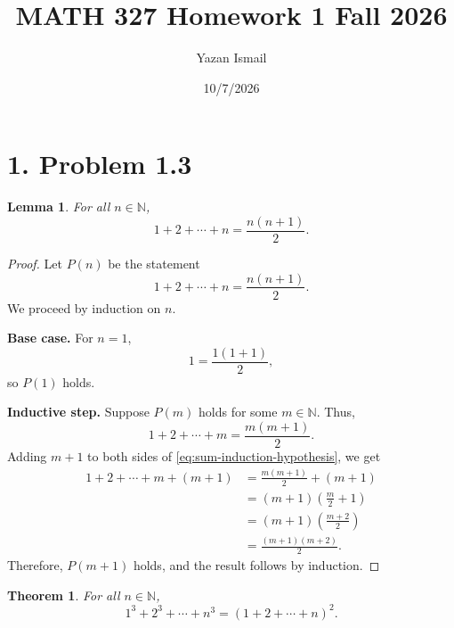 \documentclass[11pt]{article}
\title{MATH 327 Homework 1 Fall 2026}
\author{Yazan Ismail}
\date{10/7/2026}
\newtheorem{theorem}{Theorem}
\newtheorem{lemma}{Lemma}
\begin{document}
\maketitle

\section*{1. Problem 1.3}

\begin{lemma}\label{lem:sum}
For all \(n\in\mathbb{N}\),
\[
1+2+\cdots+n=\frac{n(n+1)}{2}.
\]
\end{lemma}

\begin{proof}
Let \(P(n)\) be the statement
\[
1+2+\cdots+n=\frac{n(n+1)}{2}.
\]
We proceed by induction on \(n\).

\textbf{Base case.} For \(n=1\),
\[
1=\frac{1(1+1)}{2},
\]
so \(P(1)\) holds.

\textbf{Inductive step.} Suppose \(P(m)\) holds for some \(m\in\mathbb{N}\).
Thus,
\begin{equation}\label{eq:sum-induction-hypothesis}
1+2+\cdots+m=\frac{m(m+1)}{2}.
\end{equation}
Adding \(m+1\) to both sides of \eqref{eq:sum-induction-hypothesis}, we get
\begin{align*}
1+2+\cdots+m+(m+1)
&=\frac{m(m+1)}{2}+(m+1)\\
&=(m+1)\left(\frac{m}{2}+1\right)\\
&=(m+1)\left(\frac{m+2}{2}\right)\\
&=\frac{(m+1)(m+2)}{2}.
\end{align*}
Therefore, \(P(m+1)\) holds, and the result follows by induction.
\end{proof}

\begin{theorem}
For all \(n\in\mathbb{N}\),
\[
1^3+2^3+\cdots+n^3=(1+2+\cdots+n)^2.
\]
\end{theorem}
\end{document}
